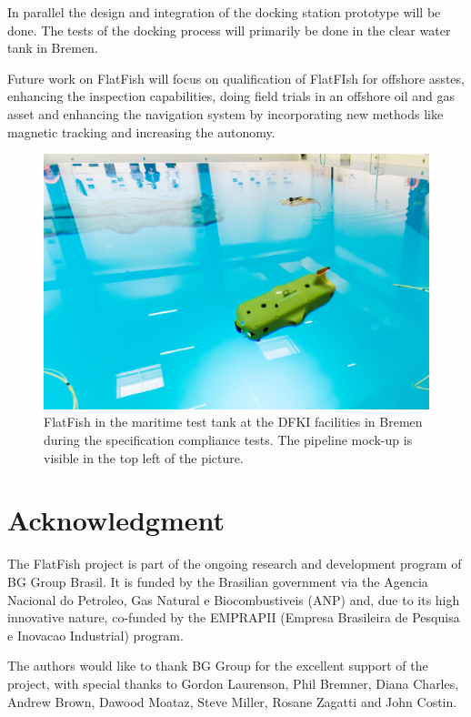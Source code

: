 \documentclass[conference]{IEEEtran}
\begin{document}
In parallel the design and integration of the docking station prototype will be done. The 
tests of the docking process will primarily be done in the clear water tank in Bremen.

Future work on FlatFish will focus on qualification of FlatFIsh for offshore asstes, enhancing 
the inspection capabilities, doing field trials in an offshore oil and gas asset and enhancing 
the navigation system by incorporating new methods like magnetic tracking 
\cite{christensen2015} and increasing the autonomy. 

\begin{figure}[!t]
	\centering
	\includegraphics[width=0.9\columnwidth]{FlatFish-2.jpg}
	\caption{FlatFish in the maritime test tank at the DFKI facilities in Bremen during the 
	specification compliance tests. The pipeline mock-up is visible in the top left of the 
	picture.}
	\label{fig:flatfish2}
\end{figure}

\section*{Acknowledgment}

The FlatFish project is part of the ongoing research and development program of BG Group
Brasil. It is funded by the Brasilian government via the Agencia Nacional do Petroleo, Gas
Natural e Biocombustiveis (ANP) and, due to its high innovative nature, co-funded by the
EMPRAPII (Empresa Brasileira de Pesquisa e Inovacao Industrial) program. 

The authors would like to thank BG Group for the excellent support of the project, with
special thanks to Gordon Laurenson, Phil Bremner, Diana Charles, Andrew Brown, Dawood 
Moataz, Steve Miller, Rosane Zagatti and John Costin.







\end{document}
